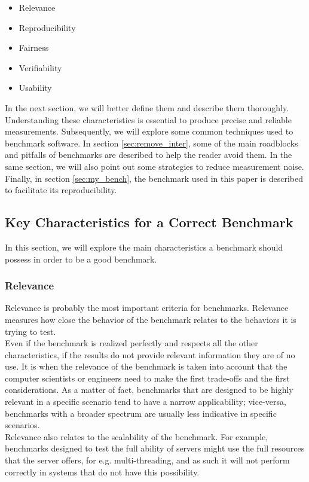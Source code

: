 \begin{itemize}
    \item Relevance
    \item Reproducibility
    \item Fairness
    \item Verifiability
    \item Usability
\end{itemize}
In the next section, we will better define them and describe them thoroughly. Understanding these characteristics is essential to produce precise and reliable measurements. Subsequently, we will explore some common techniques used to benchmark software. In section \ref{sec:remove_inter}, some of the main roadblocks and pitfalls of benchmarks are described to help the reader avoid them. In the same section, we will also point out some strategies to reduce measurement noise. Finally, in section \ref{sec:my_bench}, the benchmark used in this paper is described to facilitate its reproducibility. \\









\subsection{Key Characteristics for a Correct Benchmark}\label{key_char}
In this section, we will explore the main characteristics a benchmark should possess in order to be a good benchmark.
\subsubsection{Relevance}
Relevance is probably the most important criteria for benchmarks. Relevance measures how close the behavior of the benchmark relates to the behaviors it is trying to test. \cite{how_to_bench}\\
Even if the benchmark is realized perfectly and respects all the other characteristics, if the results do not provide relevant information they are of no use. It is when the relevance of the benchmark is taken into account that the computer scientists or engineers need to make the first trade-offs and the first considerations. As a matter of fact, benchmarks that are designed to be highly relevant in a specific scenario tend to have a narrow applicability; vice-versa, benchmarks with a broader spectrum are usually less indicative in specific scenarios. \cite{how_to_bench}\\
Relevance also relates to the scalability of the benchmark. For example, benchmarks designed to test the full ability of servers might use the full resources that the server offers, for e.g. multi-threading, and as such it will not perform correctly in systems that do not have this possibility. \cite{how_to_bench}

